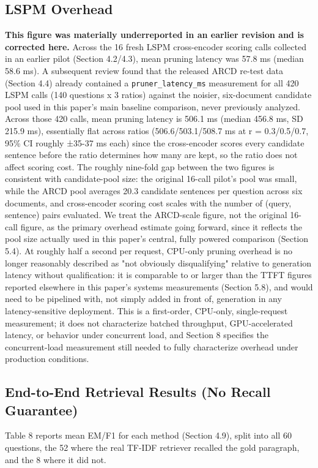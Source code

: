 \subsection{LSPM Overhead}
\textbf{This figure was materially underreported in an earlier revision and is corrected here.} Across the 16 fresh LSPM cross-encoder scoring calls collected in an earlier pilot (Section 4.2/4.3), mean pruning latency was 57.8 ms (median 58.6 ms). A subsequent review found that the released ARCD re-test data (Section 4.4) already contained a \texttt{pruner\_latency\_ms} measurement for all 420 LSPM calls (140 questions x 3 ratios) against the noisier, six-document candidate pool used in this paper's main baseline comparison, never previously analyzed. Across those 420 calls, mean pruning latency is 506.1 ms (median 456.8 ms, SD 215.9 ms), essentially flat across ratios (506.6/503.1/508.7 ms at r = 0.3/0.5/0.7, 95\% CI roughly ±35-37 ms each) since the cross-encoder scores every candidate sentence before the ratio determines how many are kept, so the ratio does not affect scoring cost. The roughly nine-fold gap between the two figures is consistent with candidate-pool size: the original 16-call pilot's pool was small, while the ARCD pool averages 20.3 candidate sentences per question across six documents, and cross-encoder scoring cost scales with the number of (query, sentence) pairs evaluated. We treat the ARCD-scale figure, not the original 16-call figure, as the primary overhead estimate going forward, since it reflects the pool size actually used in this paper's central, fully powered comparison (Section 5.4). At roughly half a second per request, CPU-only pruning overhead is no longer reasonably described as "not obviously disqualifying" relative to generation latency without qualification: it is comparable to or larger than the TTFT figures reported elsewhere in this paper's systems measurements (Section 5.8), and would need to be pipelined with, not simply added in front of, generation in any latency-sensitive deployment. This is a first-order, CPU-only, single-request measurement; it does not characterize batched throughput, GPU-accelerated latency, or behavior under concurrent load, and Section 8 specifies the concurrent-load measurement still needed to fully characterize overhead under production conditions.

\subsection{End-to-End Retrieval Results (No Recall Guarantee)}
Table 8 reports mean EM/F1 for each method (Section 4.9), split into all 60 questions, the 52 where the real TF-IDF retriever recalled the gold paragraph, and the 8 where it did not.

